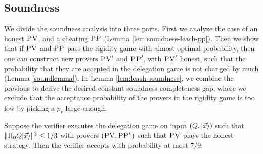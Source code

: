 \subsection{Soundness}



We divide the soundness analysis into three parts. First we analyze the case of an honest $\textsc{PV}$, and a cheating $\textsc{PP}$ (Lemma \ref{lem:soundness-leash-pp}). Then we show that if $\textsc{PV}$ and $\textsc{PP}$ pass the rigidity game with almost optimal probability, then one can construct new provers $\textsc{PV}'$ and $\textsc{PP}'$, with $\textsc{PV}'$ honest, such that the probability that they are accepted in the delegation game is not changed by much (Lemma \ref{soundlemma}). In Lemma \ref{lem:leash-soundness}, we combine the previous to derive the desired constant soundness-completeness gap, where we exclude that the acceptance probability of the provers in the rigidity game is too low by picking a $p_r$ large enough.


\begin{lemma}\label{lem:soundness-leash-pp}
Suppose the verifier executes the delegation  game on input $(Q,|\vec{x}\rangle)$ such that $\|\Pi_0 Q|\vec{x}\rangle\|^2 \leq 1/3$ with provers $(\textsc{PV},\textsc{PP}^*)$ such that $\textsc{PV}$ plays the honest strategy. Then the verifier accepts with probability at most $7/9$. 
\end{lemma}

